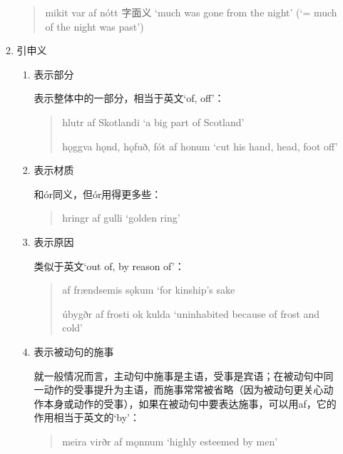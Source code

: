 \begin{enumerate}[itemindent=1em, label=\textbf{\arabic*}.]
\begin{enumerate}
\begin{quote}
                        mikit var af nótt 字面义 `much was gone from the night' (`= much of the night was past')
                    \end{quote}

              \item 引申义
                    \begin{enumerate}

                        \item 表示部分

                              表示整体中的一部分，相当于英文`of, off'：
                              \begin{quote}
                                  hlutr af Skotlandi `a big part of Scotland'

                                  h\k{o}ggva h\k{o}nd, h\k{o}fuð, fót af honum `cut his hand, head, foot off'
                              \end{quote}

                        \item 表示材质

                              和ór同义，但ór用得更多些：
                              \begin{quote}
                                  hringr af gulli `golden ring'
                              \end{quote}

                        \item 表示原因

                              类似于英文`out of, by reason of'：
                              \begin{quote}
                                  af frændsemis s\k{o}kum `for kinship's sake

                                  úbygðr af frosti ok kulda `uninhabited because of frost and cold'
                              \end{quote}

                        \item 表示被动句的施事

                              就一般情况而言，主动句中施事是主语，受事是宾语；在被动句中同一动作的受事提升为主语，而施事常常被省略（因为被动句更关心动作本身或动作的受事），如果在被动句中要表达施事，可以用af，它的作用相当于英文的`by'：
                              \begin{quote}
                                  meira virðr af m\k{o}nnum `highly esteemed by men'
                              \end{quote}
                    \end{enumerate}
          \end{enumerate}


\end{enumerate}
